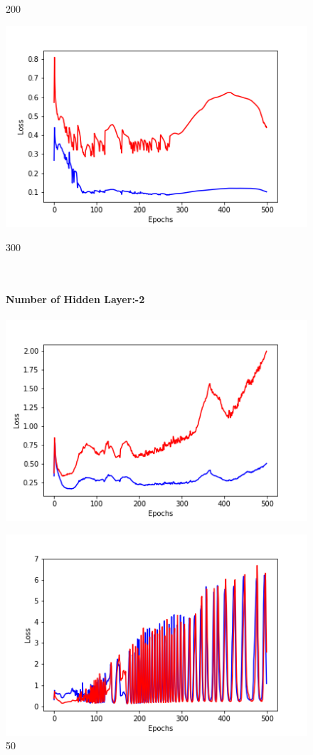\documentclass[20pt]{report}
\begin{document}
\begin{figure}[!htb]
	\caption{200}
\endminipage\hfill
{}
  \includegraphics[width=\linewidth]{1_300.png}
	\caption{300}
\endminipage\hfill
\\\\
\textbf{Number of Hidden Layer:-2}\\\\
  \includegraphics[width=\linewidth]{2_50.png}
	\caption{50}
\endminipage\hfill
{}
  \includegraphics[width=\linewidth]{2_100.png}

\end{figure}
\end{document}
